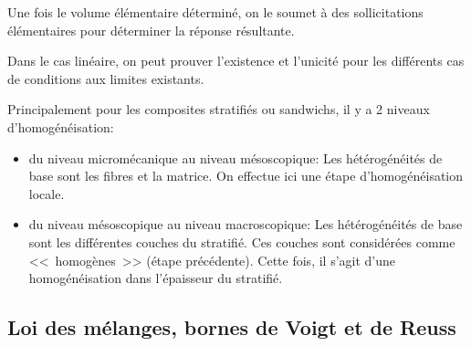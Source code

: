 \medskip
Une fois le volume élémentaire déterminé, on le soumet à des sollicitations élémentaires
pour déterminer la réponse résultante. 

\medskip
Dans le cas linéaire, on peut prouver l'existence et l'unicité pour les différents cas de
conditions aux limites existants.

\medskip
Principalement pour les composites stratifiés ou sandwichs, il y a 2 niveaux d'homogénéisation:
\begin{itemize}
	\item du niveau micromécanique au niveau mésoscopique:
		Les hétérogénéités de base sont les fibres et la matrice. On effectue ici
		 une étape d'homogénéisation locale.
	\item du niveau mésoscopique au niveau macroscopique:
		Les hétérogénéités de base sont les différentes couches du stratifié.
		 Ces couches sont considérées comme <<~homogènes~>> (étape précédente).
		 Cette fois, il s'agit d'une homogénéisation dans l'épaisseur du stratifié.
\end{itemize}



\medskip
\subsection{Loi des mélanges, bornes de Voigt et de Reuss}


